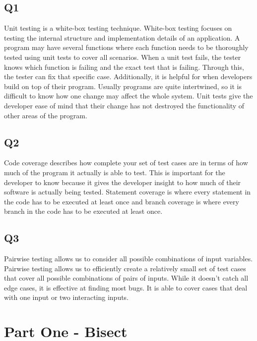 \documentclass[12pt, letterpaper, titlepage]{article}
\begin{document}
\subsection*{Q1}
Unit testing is a white-box testing technique. White-box testing focuses on testing the internal structure and implementation details of an application. A program may have several functions where each function needs to be thoroughly tested using unit tests to cover all scenarios. When a unit test fails, the tester knows which function is failing and the exact test that is failing. Through this, the tester can fix that specific case. Additionally, it is helpful for when developers build on top of their program. Usually programs are quite intertwined, so it is difficult to know how one change may affect the whole system. Unit tests give the developer ease of mind that their change has not destroyed the functionality of other areas of the program. 

\subsection*{Q2}
Code coverage describes how complete your set of test cases are in terms of how much of the program it actually is able to test. This is important for the developer to know because it gives the developer insight to how much of  their software is actually being tested. Statement coverage is where every statement in the code has to be executed at least once and branch coverage is where every branch in the code has to be executed at least once.

\subsection*{Q3}
Pairwise testing allows us to consider all possible combinations of input variables. Pairwise testing allows us to efficiently create a relatively small set of test cases that cover all possible combinations of pairs of inputs. While it doesn't catch all edge cases, it is effective at finding most bugs. It is able to cover cases that deal with one input or two interacting inputs. 

\section{Part One - Bisect}
\end{document}
